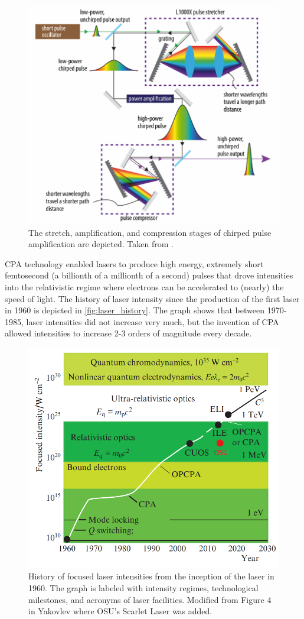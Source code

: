 \begin{figure}
	\centering
	\includegraphics[width=0.9\linewidth]{planning/images/cpa.PNG}
	\caption{The stretch, amplification, and compression stages of chirped pulse amplification are depicted. Taken from \cite{Arrigoni_2019_Photonics}.}
	\label{fig:cpa}
\end{figure}
\gls{CPA} technology enabled lasers to produce high energy, extremely short femtosecond (a billionth of a millionth of a second) pulses that drove intensities into the relativistic regime where electrons can be accelerated to (nearly) the speed of light. The history of laser intensity since the production of the first laser in 1960 is depicted in \autoref{fig:laser_history}. The graph shows that between 1970-1985, laser intensities did not increase very much, but the invention of \gls{CPA} allowed intensities to increase 2-3 orders of magnitude every decade.

\begin{figure}
	\centering
	\includegraphics[width=0.75\linewidth]{planning/images/laser_history.PNG}
	\caption{History of focused laser intensities from the inception of the laser in 1960. The graph is labeled with intensity regimes, technological milestones, and acronyms of laser facilities. Modified from Figure 4 in Yakovlev \cite{Yakovlev_2014_QE} where OSU's Scarlet Laser was added.}
	\label{fig:laser_history}
\end{figure}

